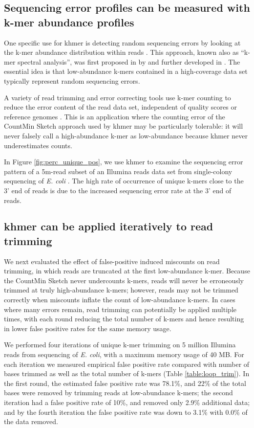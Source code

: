 \documentclass[10pt]{article}
\begin{document}
\subsection*{Sequencing error profiles can be measured with k-mer abundance
profiles}

One specific use for khmer is detecting random sequencing errors by
looking at the k-mer abundance distribution within reads
\cite{Medvedev2011}.  This approach, known also as ``k-mer spectral
analysis'', was first proposed in by \cite{Pevzner2001} and further
developed in \cite{Li2003}.  The essential idea is that low-abundance
k-mers contained in a high-coverage data set typically represent
random sequencing errors.

A variety of read trimming and error correcting tools use k-mer
counting to reduce the error content of the read data set, independent
of quality scores or reference genomes \cite{Kelley2010}.  This is an
application where the counting error of the CountMin Sketch approach
used by khmer may be particularly tolerable: it will never falsely
call a high-abundance k-mer as low-abundance because khmer never
underestimates counts.

In Figure \ref{fig:perc_unique_pos}, we use khmer to examine the
sequencing error pattern of a 5m-read subset of an Illumina reads data
set from single-colony sequencing of {\em E. coli}
\cite{pubmed21926975}.  The high rate of occurrence of unique k-mers
close to the 3' end of reads is due to the increased sequencing error
rate at the 3' end of reads.

\subsection*{khmer can be applied iteratively to read trimming}

We next evaluated the effect of false-positive induced miscounts on
read trimming, in which reads are truncated at the first low-abundance
k-mer.  Because the CountMin Sketch never undercounts k-mers, reads
will never be erroneously trimmed at truly high-abundance k-mers;
however, reads may not be trimmed correctly when miscounts inflate the
count of low-abundance k-mers.  In cases where many errors remain,
read trimming can potentially be applied multiple times, with each
round reducing the total number of k-mers and hence resulting in lower
false positive rates for the same memory usage.

We performed four iterations of unique k-mer trimming on 5 million
Illumina reads from sequencing of {\em E. coli}, with a maximum memory
usage of 40 MB.  For each iteration we measured empirical false
positive rate compared with number of bases trimmed as well as the
total number of k-mers (Table \ref{table:loop_trim}).  In the first
round, the estimated false positive rate was 78.1\%, and 22\% of the
total bases were removed by trimming reads at low-abundance k-mers;
the second iteration had a false positive rate of 10\%, and removed
only 2.9\% additional data; and by the fourth iteration the false
positive rate was down to 3.1\% with 0.0\% of the data removed.
\end{document}
